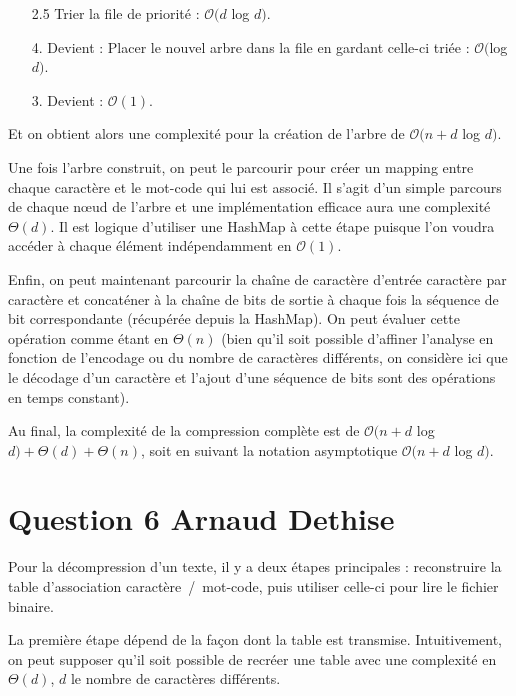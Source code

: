 \documentclass[10pt,a4paper]{article}
\begin{document}
	\begin{enumerate}
	\item[2.5] Trier la file de priorité : $\mathcal{O}(d $ log $d)$.
	\item[4.] Devient : Placer le nouvel arbre dans la file en gardant celle-ci triée : $\mathcal{O}($log $d)$.
	\item[3.] Devient : $\mathcal{O}(1)$.
	\end{enumerate}
	\vspace{0.3cm}
	
	Et on obtient alors une complexité pour la création de l'arbre de $\mathcal{O}(n + d $ log $ d)$.
	
	Une fois l'arbre construit, on peut le parcourir pour créer un mapping entre chaque caractère et le mot-code qui lui est associé. 
	Il s'agit d'un simple parcours de chaque nœud de l'arbre et une implémentation efficace aura une complexité $\Theta(d)$. 
	Il est logique d'utiliser une HashMap à cette étape puisque l'on voudra accéder à chaque élément indépendamment en $\mathcal{O}(1)$.
	
	Enfin, on peut maintenant parcourir la chaîne de caractère d'entrée caractère par caractère et concaténer à la chaîne de bits de sortie à chaque fois la séquence de bit correspondante (récupérée depuis la HashMap). 
	On peut évaluer cette opération comme étant en $\Theta(n)$ (bien qu'il soit possible  d'affiner l'analyse en fonction de l'encodage ou du nombre de caractères différents, on considère ici que le décodage d'un caractère et l'ajout d'une séquence de bits sont des opérations en temps constant).
	
	\vspace{0.3cm}
	Au final, la complexité de la compression complète est de $\mathcal{O}(n + d $ log $ d) + \Theta(d) + \Theta(n)$, soit en suivant la notation asymptotique $\mathcal{O}(n + d $ log $ d)$.
	

\section*{Question 6 Arnaud Dethise}

	Pour la décompression d'un texte, il y a deux étapes principales : reconstruire la table d'association caractère~/~mot-code, puis utiliser celle-ci pour lire le fichier binaire.
	
	La première étape dépend de la façon dont la table est transmise. Intuitivement, on peut supposer qu'il soit possible de recréer une table avec une complexité en $\Theta(d)$, $d$ le nombre de caractères différents.
	
\end{document}
